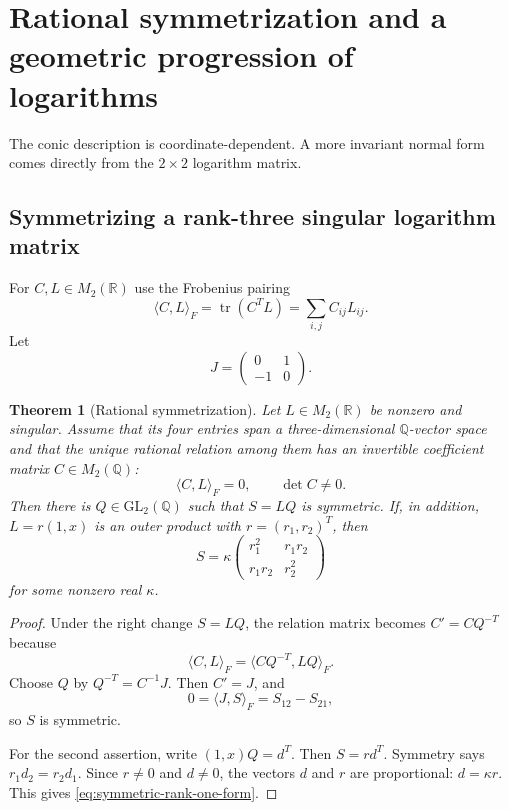 \documentclass[11pt]{article}
\newtheorem{theorem}{Theorem}[section]
\theoremstyle{definition}
\theoremstyle{remark}
\newcommand{\Q}{\mathbb{Q}}
\newcommand{\R}{\mathbb{R}}
\begin{document}
\section{Rational symmetrization and a geometric progression of logarithms}
\label{sec:symmetrization}

The conic description is coordinate-dependent.  A more invariant normal form comes directly
from the $2\times2$ logarithm matrix.

\subsection{Symmetrizing a rank-three singular logarithm matrix}

For $C,L\in M_2(\R)$ use the Frobenius pairing
\[
 \langle C,L\rangle_F=\operatorname{tr}(C^TL)=\sum_{i,j}C_{ij}L_{ij}.
\]
Let
\[
 J=\begin{pmatrix}0&1\\-1&0\end{pmatrix}.
\]

\begin{theorem}[Rational symmetrization]
\label{thm:rational-symmetrization}
Let $L\in M_2(\R)$ be nonzero and singular.  Assume that its four entries span a
three-dimensional $\Q$-vector space and that the unique rational relation among them has an
invertible coefficient matrix $C\in M_2(\Q)$:
\[
 \langle C,L\rangle_F=0,
 \qquad \det C\ne0.
\]
Then there is $Q\in\mathrm{GL}_2(\Q)$ such that $S=LQ$ is symmetric.  If, in addition,
$L=r(1,x)$ is an outer product with $r=(r_1,r_2)^T$, then
\begin{equation}
 S=\kappa
 \begin{pmatrix}
 r_1^2&r_1r_2\\
 r_1r_2&r_2^2
 \end{pmatrix}
 \label{eq:symmetric-rank-one-form}
\end{equation}
for some nonzero real $\kappa$.
\end{theorem}

\begin{proof}
Under the right change $S=LQ$, the relation matrix becomes
$C'=CQ^{-T}$ because
\[
 \langle C,L\rangle_F
 =\langle CQ^{-T},LQ\rangle_F.
\]
Choose $Q$ by $Q^{-T}=C^{-1}J$.  Then $C'=J$, and
\[
 0=\langle J,S\rangle_F=S_{12}-S_{21},
\]
so $S$ is symmetric.

For the second assertion, write $(1,x)Q=d^T$.  Then $S=rd^T$.  Symmetry says
$r_1d_2=r_2d_1$.  Since $r\ne0$ and $d\ne0$, the vectors $d$ and $r$ are proportional:
$d=\kappa r$.  This gives \eqref{eq:symmetric-rank-one-form}.
\end{proof}
\end{document}
